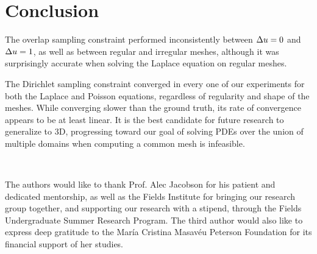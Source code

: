\documentclass[11pt,a4paper, final, twoside]{article}
\theoremstyle{proposition}
\theoremstyle{definition}
\theoremstyle{remark}
\numberwithin{equation}{section}
\begin{document}
\newpage
\section{Conclusion}

The overlap sampling constraint performed inconsistently between $\Delta u = 0$ and $\Delta u = 1$, as well as between regular and irregular meshes, although it was surprisingly accurate when solving the Laplace equation on regular meshes.

The Dirichlet sampling constraint converged in every one of our experiments for both the Laplace and Poisson equations, regardless of regularity and shape of the meshes. While converging slower than the ground truth, its rate of convergence appears to be at least linear. It is the best candidate for future research to generalize to 3D, progressing toward our goal of solving PDEs over the union of multiple domains when computing a common mesh is infeasible.

\mbox{}\\


The authors would like to thank Prof. Alec Jacobson for his patient and dedicated mentorship, as well as the Fields Institute for bringing our research group together, and supporting our research with a stipend, through the Fields Undergraduate Summer Research Program. The third author would also like to express deep gratitude to the Mar\'ia Cristina Masav\'eu Peterson Foundation for its financial support of her studies.



\end{document}
